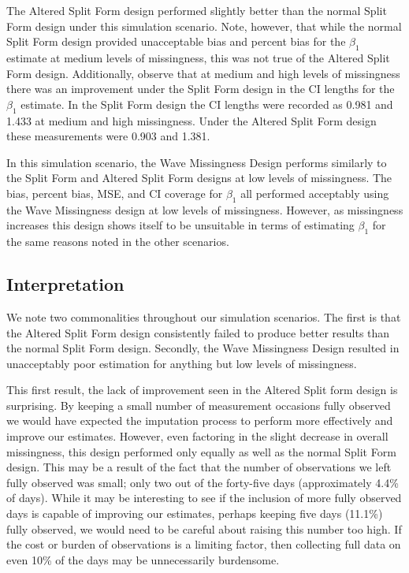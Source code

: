 \documentclass{svjour3}\usepackage[]{graphicx}\usepackage[]{color}
\begin{document}
The Altered Split Form design performed slightly better than the normal Split Form design under this simulation scenario. Note, however, that while the normal Split Form design provided unacceptable bias and percent bias for the $\beta_1$ estimate at medium levels of missingness, this was not true of the Altered Split Form design. Additionally, observe that at medium and high levels of missingness there was an improvement under the Split Form design in the CI lengths for the $\beta_1$ estimate. In the Split Form design the CI lengths were recorded as 0.981 and 1.433 at medium and high missingness. Under the Altered Split Form design these measurements were 0.903 and 1.381. \par

In this simulation scenario, the Wave Missingness Design performs similarly to the Split Form and Altered Split Form designs at low levels of missingness. The bias, percent bias, MSE, and CI coverage for $\beta_1$ all performed acceptably using the Wave Missingness design at low levels of missingness. However, as missingness increases this design shows itself to be unsuitable in terms of estimating $\beta_1$ for the same reasons noted in the other scenarios. \par

\subsection{Interpretation}
\label{sec:3.5}
We note two commonalities throughout our simulation scenarios. The first is that the Altered Split Form design consistently failed to produce better results than the normal Split Form design. Secondly, the Wave Missingness Design resulted in unacceptably poor estimation for anything but low levels of missingness. \par

This first result, the lack of improvement seen in the Altered Split form design is surprising. By keeping a small number of measurement occasions fully observed we would have expected the imputation process to perform more effectively and improve our estimates. However, even factoring in the slight decrease in overall missingness, this design performed only equally as well as the normal Split Form design. This may be a result of the fact that the number of observations we left fully observed was small; only two out of the forty-five days (approximately 4.4\% of days). While it may be interesting to see if the inclusion of more fully observed days is capable of improving our estimates, perhaps keeping five days (11.1\%) fully observed, we would need to be careful about raising this number too high. If the cost or burden of observations is a limiting factor, then collecting full data on even 10\% of the days may be unnecessarily burdensome. \par
\end{document}
